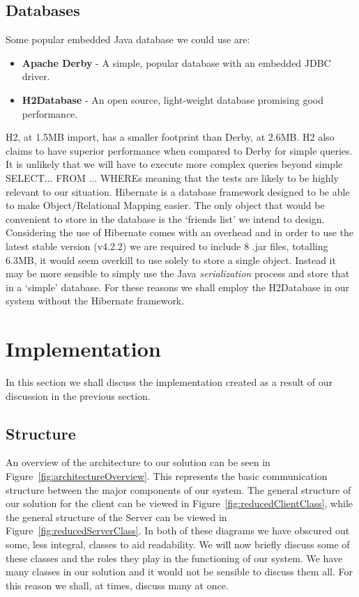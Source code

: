\documentclass[12pt, titlepage]{article}
\begin{document}
\subsection{Databases}
Some popular embedded Java database we could use are:
\begin{itemize}
	\item \textbf{Apache Derby} - A simple, popular database with an embedded JDBC driver.
	\item \textbf{H2Database} - An open source, light-weight database promising good performance.
\end{itemize}
H2, at 1.5MB import, has a smaller footprint than Derby,  at 2.6MB. H2 also claims to have superior performance when compared to Derby for simple queries.\cite{h2Performance} It is unlikely that we will have to execute more complex queries beyond simple SELECT... FROM ... WHEREs meaning that the tests are likely to be highly relevant to our situation.
\newline \indent Hibernate is a database framework designed to be able to make Object/Relational Mapping easier. The only object that would be convenient to store in the database is the `friends list' we intend to design. Considering the use of Hibernate comes with an overhead and in order to use the latest stable version (v4.2.2) we are required to include 8 .jar files, totalling 6.3MB, it would seem overkill to use solely to store a single object. Instead it may be more sensible to simply use the Java \textit{serialization} process and store that in a `simple' database.
\newline \indent For these reasons we shall employ the H2Database in our system without the Hibernate framework.

\newpage
\section{Implementation}
In this section we shall discuss the implementation created as a result of our discussion in the previous section.
\subsection{Structure}
An overview of the architecture to our solution can be seen in Figure~\ref{fig:architectureOverview}. This represents the basic communication structure between the major components of our system.
\newline \indent The general structure of our solution for the client can be viewed in Figure~\ref{fig:reducedClientClass}, while the general structure of the Server can be viewed in Figure~\ref{fig:reducedServerClass}. In both of these diagrams we have obscured out some, less integral, classes to aid readability.
\newline \indent We will now briefly discuss some of these classes and the roles they play in the functioning of our system. We have many classes in our solution and it would not be sensible to discuss them all. For this reason we shall, at times, discuss many at once.
 
\end{document}
